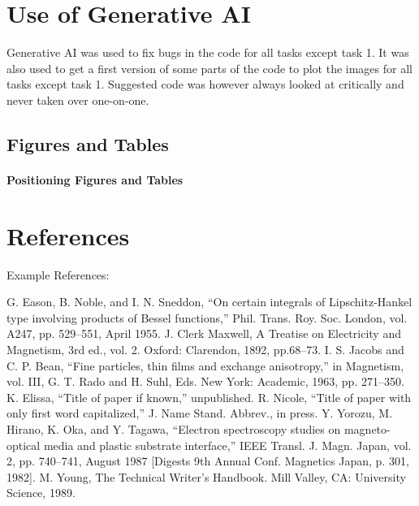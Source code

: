 \documentclass[conference]{IEEEtran}
\begin{document}
\section{Use of Generative AI}\label{sec:generative_AI}
Generative AI was used to fix bugs in the code for all tasks except task 1. It was also used to get a first version of some parts of the code to plot the images for all tasks except task 1. Suggested code was however always looked at critically and never taken over one-on-one.

\subsection{Figures and Tables}
\paragraph{Positioning Figures and Tables}




\section*{References}
Example References:
\begin{thebibliography}{00}
 G. Eason, B. Noble, and I. N. Sneddon, ``On certain integrals of Lipschitz-Hankel type involving products of Bessel functions,'' Phil. Trans. Roy. Soc. London, vol. A247, pp. 529--551, April 1955.
 J. Clerk Maxwell, A Treatise on Electricity and Magnetism, 3rd ed., vol. 2. Oxford: Clarendon, 1892, pp.68--73.
 I. S. Jacobs and C. P. Bean, ``Fine particles, thin films and exchange anisotropy,'' in Magnetism, vol. III, G. T. Rado and H. Suhl, Eds. New York: Academic, 1963, pp. 271--350.
 K. Elissa, ``Title of paper if known,'' unpublished.
 R. Nicole, ``Title of paper with only first word capitalized,'' J. Name Stand. Abbrev., in press.
 Y. Yorozu, M. Hirano, K. Oka, and Y. Tagawa, ``Electron spectroscopy studies on magneto-optical media and plastic substrate interface,'' IEEE Transl. J. Magn. Japan, vol. 2, pp. 740--741, August 1987 [Digests 9th Annual Conf. Magnetics Japan, p. 301, 1982].
 M. Young, The Technical Writer's Handbook. Mill Valley, CA: University Science, 1989.
\end{thebibliography}
\end{document}
